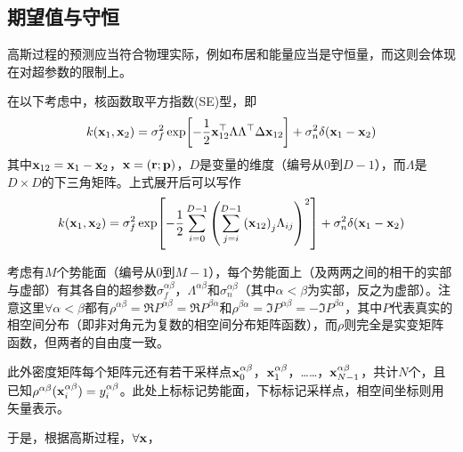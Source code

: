 \documentclass[12pt,UTF8]{article}
\begin{document}
        \subsection{期望值与守恒}
			高斯过程的预测应当符合物理实际，例如布居和能量应当是守恒量，而这则会体现在对超参数的限制上。\par
			在以下考虑中，核函数取平方指数(SE)型，即
			\begin{equation}
				k(\vb{x}_1,\vb{x}_2)=\sigma_f^2\exp[-\frac{1}{2}\vb{x}_{12}^\top\Lambda\Lambda^\top\Delta\vb{x}_{12}]+\sigma_n^2\delta(\vb{x}_1-\vb{x}_2)
			\end{equation}
            其中$\vb{x}_{12}=\vb{x}_1-\vb{x}_2$，$\vb{x}=(\vb{r};\vb{p})$，$D$是变量的维度（编号从$0$到$D-1$），而$\Lambda$是$D\times D$的下三角矩阵。上式展开后可以写作
            \begin{equation}
                k(\vb{x}_1,\vb{x}_2)=\sigma_f^2\exp[-\frac{1}{2}\sum_{i=0}^{D-1}{\qty(\sum_{j=i}^{D-1}{\qty(\vb{x}_{12})_j}\Lambda_{ij})^2}]+\sigma_n^2\delta(\vb{x}_1-\vb{x}_2)
            \end{equation}\par
            考虑有$M$个势能面（编号从$0$到$M-1$），每个势能面上（及两两之间的相干的实部与虚部）有其各自的超参数$\sigma_{f}^{\alpha\beta}$，$\Lambda^{\alpha\beta}$和$\sigma_{n}^{\alpha\beta}$（其中$\alpha<\beta$为实部，反之为虚部）。注意这里$\forall \alpha<\beta$都有$\rho^{\alpha\beta}=\Re{P^{\alpha\beta}}=\Re{P^{\beta\alpha}}$和$\rho^{\beta\alpha}=\Im{P^{\alpha\beta}}=-\Im{P^{\beta\alpha}}$，其中$P$代表真实的相空间分布（即非对角元为复数的相空间分布矩阵函数），而$\rho$则完全是实变矩阵函数，但两者的自由度一致。\par
            此外密度矩阵每个矩阵元还有若干采样点$\vb{x}_0^{\alpha\beta}$，$\vb{x}_1^{\alpha\beta}$，……，$\vb{x}_{N-1}^{\alpha\beta}$，共计$N$个，且已知$\rho^{\alpha\beta}(\vb{x}_i^{\alpha\beta})=y_i^{\alpha\beta}$。此处上标标记势能面，下标标记采样点，相空间坐标则用矢量表示。\par
			于是，根据高斯过程，$\forall \vb{x}$，
\end{document}
